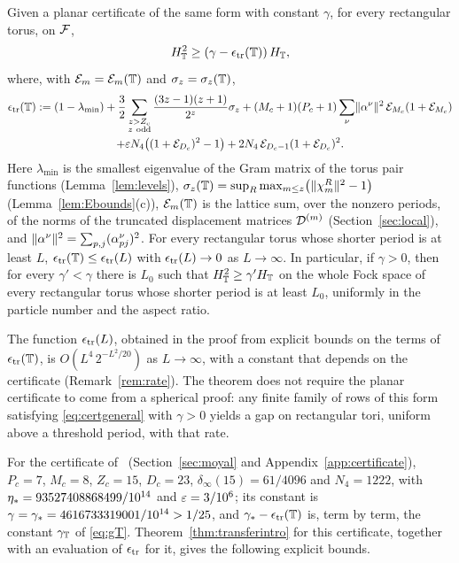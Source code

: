\begin{theorem}\label{thm:transferintro}
Given a planar certificate of the same form with constant $\gamma$, for every rectangular torus, on $\mathcal{F}$,
\[
H_{\mathbb{T}}^2\ge(\gamma-\epsilon_{\mathrm{tr}}(\mathbb{T}))\,H_{\mathbb{T}},
\]
where, with $\mathcal{E}_m=\mathcal{E}_m(\mathbb{T})$ and $\sigma_z=\sigma_z(\mathbb{T})$,
\begin{multline*}
\etr(\Tor):=(1-\lambda_{\min})+\frac32\sum_{\substack{z>Z_c\\ z\ \mathrm{odd}}}\frac{(3z-1)(z+1)}{2^z}\sigma_z
+(M_c+1)(P_c+1)\sum_\nu\norm{\alpha^\nu}^2\,\Ec_{M_c}(1+\Ec_{M_c})\\
+\eps N_4\bigl((1+\Ec_{D_c})^2-1\bigr)+2N_4\,\Ec_{D_c-1}(1+\Ec_{D_c})^2 .
\end{multline*}
Here $\lambda_{\min}$ is the smallest eigenvalue of the Gram matrix of the torus pair functions (Lemma~\ref{lem:levels}),
$\sigma_z(\mathbb{T})=\sup_R\max_{m\le z}\bigl(\lVert\chi^R_m\rVert^2-1\bigr)$ (Lemma~\ref{lem:Ebounds}(c)), $\mathcal{E}_m(\mathbb{T})$ is the lattice sum, over
the nonzero periods, of the norms of the truncated displacement matrices $\mathcal{D}^{(m)}$ (Section~\ref{sec:local}), and
$\lVert\alpha^\nu\rVert^2=\sum_{p,j}(\alpha^\nu_{pj})^2$. For every rectangular torus whose shorter period is at least $L$, $\epsilon_{\mathrm{tr}}(\mathbb{T})\le\epsilon_{\mathrm{tr}}(L)$
with $\epsilon_{\mathrm{tr}}(L)\to0$ as $L\to\infty$. In particular, if $\gamma>0$, then for every $\gamma'<\gamma$ there is $L_0$ such that $H_{\mathbb{T}}^2\ge\gamma'H_{\mathbb{T}}$
on the whole Fock space of every rectangular torus whose shorter period is at least $L_0$, uniformly in the particle number and the
aspect ratio.
\end{theorem}

The function $\epsilon_{\mathrm{tr}}(L)$, obtained in the proof from explicit bounds on the terms of $\epsilon_{\mathrm{tr}}(\mathbb{T})$, is $O(L^4\,2^{-L^2/20})$ as
$L\to\infty$, with a constant that depends on the certificate (Remark~\ref{rem:rate}). The theorem does not require the planar
certificate to come from a spherical proof: any finite family of rows of this form satisfying \eqref{eq:certgeneral} with $\gamma>0$
yields a gap on rectangular tori, uniform above a threshold period, with that rate.

For the certificate of~\cite{OAI:A-Fock-space-inequality-and-the-Laughlin-spectral-gap-September-24-2026}
(Section~\ref{sec:moyal} and Appendix~\ref{app:certificate}), $P_c=7$, $M_c=8$, $Z_c=15$, $D_c=23$, $\delta_\infty(15)=61/4096$ and
$N_4=1222$, with $\eta_{*}=93527408868499/10^{14}$ and $\varepsilon=3/10^6$; its constant is $\gamma=\gamma_{*}=4616733319001/10^{14}>1/25$, and
$\gamma_{*}-\epsilon_{\mathrm{tr}}(\mathbb{T})$ is, term by term, the constant $\gamma_{\mathbb{T}}$ of \eqref{eq:gT}. Theorem~\ref{thm:transferintro} for this certificate, together
with an evaluation of $\epsilon_{\mathrm{tr}}$ for it, gives the following explicit bounds.

